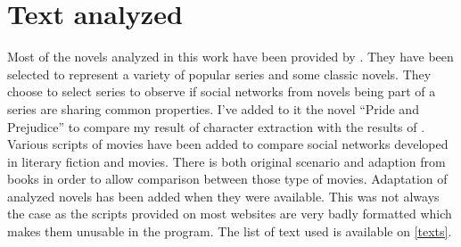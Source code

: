 \documentclass[a4paper, 12pt]{report}
\begin{document}
\section{Text analyzed}
Most of the novels analyzed in this work have been provided by \cite{original}. They have been selected to represent a variety of popular series and some classic novels. They choose to select series to observe if social networks from novels being part of a series are sharing common properties. I've added to it the novel ``Pride and Prejudice'' to compare my result of character extraction with the results of \cite{character_meta}.
Various scripts of movies have been added to compare social networks developed in literary fiction and movies. There is both original scenario and adaption from books in order to allow comparison between those type of movies. Adaptation of analyzed novels has been added when they were available. This was not always the case as the scripts provided on most websites are very badly formatted which makes them unusable in the program. The list of text used is available on \ref{texts}.


\begin{table}
\center
{}
\caption{Novels and script whose social network has been extracted. `Pride and prejudice' has been used under the form of the novel and under the form of the adaptation's script. In total there is 46 novels and 25 scripts.}
\label{texts}
\end{table}
\end{document}

